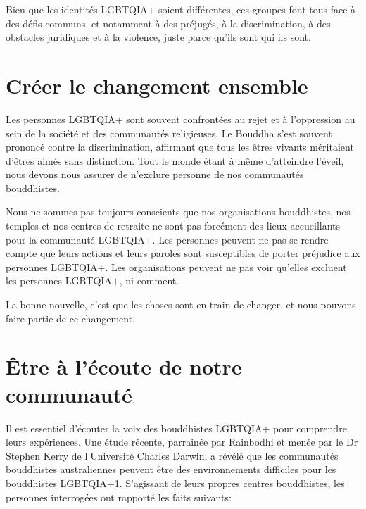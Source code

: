 \documentclass[12pt,openany]{book}
\begin{document}
Bien que les identités \mbox{LGBTQIA+} soient différentes, ces groupes font tous face à des défis communs, et notamment à des préjugés, à la discrimination, à des obstacles juridiques et à la violence, juste parce qu’ils sont qui ils sont.

\section*{Créer le changement ensemble}

\noindent Les personnes \mbox{LGBTQIA+} sont souvent confrontées au rejet et à l’oppression au sein de la société et des communautés religieuses. Le Bouddha s’est souvent prononcé contre la discrimination, affirmant que tous les êtres vivants méritaient d’êtres aimés sans distinction.
Tout le monde étant à même d’atteindre l’éveil, nous devons nous assurer de n’exclure personne de nos communautés bouddhistes.

Nous ne sommes pas toujours conscients que nos organisations bouddhistes, nos temples et nos centres de retraite ne sont pas forcément des lieux accueillants pour la communauté \mbox{LGBTQIA+}. Les personnes peuvent ne pas se rendre compte que leurs actions et leurs paroles sont susceptibles de porter préjudice aux personnes \mbox{LGBTQIA+}. Les organisations peuvent ne pas voir qu’elles excluent les personnes \mbox{LGBTQIA+}, ni comment.

La bonne nouvelle, c’est que les choses sont en train de changer, et nous pouvons faire partie de ce changement.

\section*{Être à l’écoute de notre communauté}

\noindent Il est essentiel d’écouter la voix des bouddhistes \mbox{LGBTQIA+} pour comprendre leurs expériences. Une étude récente, parrainée par Rainbodhi et menée par le Dr Stephen Kerry de l’Université Charles Darwin, a révélé que les communautés bouddhistes australiennes peuvent être des environnements difficiles pour les bouddhistes \mbox{LGBTQIA+}1. S’agissant de leurs propres centres bouddhistes, les personnes interrogées ont rapporté les faits suivants:
\end{document}
